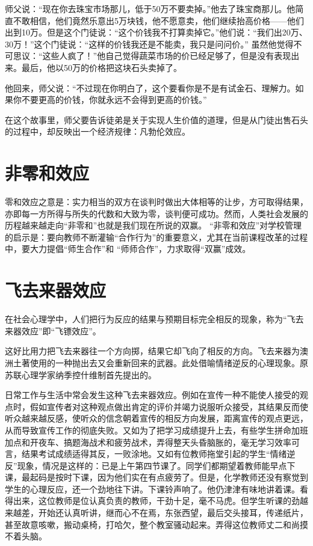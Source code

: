 \documentclass[11pt]{ctexart}
\begin{document}
师父说：“现在你去珠宝市场那儿，低于50万不要卖掉。”他去了珠宝商那儿。他简直不敢相信，他们竟然乐意出5万块钱，他不愿意卖，他们继续抬高价格——他们出到10万。但是这个门徒说：“这个价钱我不打算卖掉它。”他们说：“我们出20万、30万！”这个门徒说：“这样的价钱我还是不能卖，我只是问问价。”
虽然他觉得不可思议：“这些人疯了！”他自己觉得蔬菜市场的价已经足够了，但是没有表现出来。最后，他以50万的价格把这块石头卖掉了。

他回来，师父说：“不过现在你明白了，这个要看你是不是有试金石、理解力。如果你不要更高的价钱，你就永远不会得到更高的价钱。”

在这个故事里，师父要告诉徒弟是关于实现人生价值的道理，但是从门徒出售石头的过程中，却反映出一个经济规律：凡勃伦效应。
\section{非零和效应}
\label{sec-36}


零和效应之意是：实力相当的双方在谈判时做出大体相等的让步，方可取得结果，亦即每一方所得与所失的代数和大致为零，谈判便可成功。然而，人类社会发展的历程越来越走向“非零和”也就是我们现在所说的双赢。 “非零和效应”对学校管理的启示是：要向教师不断灌输“合作行为”的重要意义，尤其在当前课程改革的过程中，要大力提倡“师生合作”和 “师师合作”，力求取得“双赢”成效。
\section{飞去来器效应}
\label{sec-37}


在社会心理学中，人们把行为反应的结果与预期目标完全相反的现象，称为“飞去来器效应”即“飞镖效应”。

这好比用力把飞去来器往一个方向掷，结果它却飞向了相反的方向。飞去来器为澳洲土著使用的一种抛出去又会重新回来的武器。此处借喻情绪逆反的心理现象。原苏联心理学家纳季控什维制首先提出的。

日常工作与生活中常会发生这种飞去来器效应。例如在宣传一种不能使人接受的观点时，假如宣传者对这种观点做出肯定的评价并竭力说服听众接受，其结果反而使听众越来越反感，使听众的信念朝着宣传的相反方向发展，距离宣传的观点更远，从而导致宣传工作的彻底失败。又如为了把学习成绩提升上去，有些学生拼命加班加点和开夜车、搞题海战术和疲劳战术，弄得整天头昏脑胀的，毫无学习效率可言，结果考试成绩适得其反，一败涂地。又如有位教师拖堂引起的学生“情绪逆反”现象，情况是这样的：已是上午第四节课了。同学们都期望着教师能早点下课，最起码是按时下课，因为他们实在有点疲劳了。但是，化学教师还没有察觉到学生的心理反应，还一个劲地往下讲。下课铃声响了。他仍津津有味地讲着课。看得出来，这位教师是位认真负责的教师，干劲十足，毫不马虎。但学生听课的劲越来越差，开始还认真听讲，继而心不在焉，东张西望，最后交头接耳，传递纸片，甚至故意咳嗽，搬动桌椅，打哈欠，整个教室骚动起来。弄得这位教师丈二和尚摸不着头脑。
\end{document}
